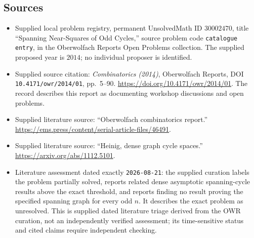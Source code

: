 \documentclass[11pt]{article}
\begin{document}
\subsection{Sources}
\begin{itemize}
\item Supplied local problem registry, permanent UnsolvedMath ID \(30002470\), title ``Spanning Near-Squares of Odd Cycles,'' source problem code \texttt{catalogue entry}, in the Oberwolfach Reports Open Problems collection. The supplied proposed year is \(2014\); no individual proposer is identified.
\item Supplied source citation: \emph{Combinatorics (2014)}, Oberwolfach Reports, DOI \texttt{10.4171/owr/2014/01}, pp.\ 5--90. \url{https://doi.org/10.4171/owr/2014/01}. The record describes this report as documenting workshop discussions and open problems.
\item Supplied literature source: ``Oberwolfach combinatorics report.'' \url{https://ems.press/content/serial-article-files/46491}.
\item Supplied literature source: ``Heinig, dense graph cycle spaces.'' \url{https://arxiv.org/abs/1112.5101}.
\item Literature assessment dated exactly \texttt{2026-08-21}: the supplied curation labels the problem partially solved, reports related dense asymptotic spanning-cycle results above the exact threshold, and reports finding no result proving the specified spanning graph for every odd \(n\). It describes the exact problem as unresolved. This is supplied dated literature triage derived from the OWR curation, not an independently verified assessment; its time-sensitive status and cited claims require independent checking.
\end{itemize}
\end{document}
